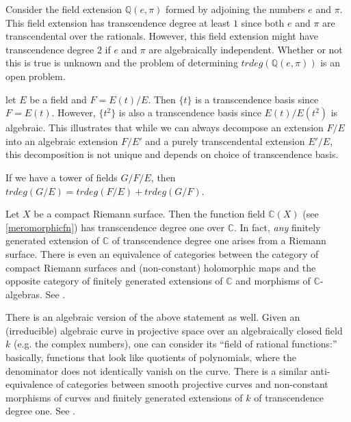 \begin{example} Consider the field extension $\mathbb{Q}(e,\pi)$ formed by
adjoining the numbers $e$ and $\pi$. This field extension has transcendence
degree at least $1$ since both $e$ and $\pi$ are transcendental over the
rationals. However, this field extension might have transcendence degree $2$ if
$e$ and $\pi$ are algebraically independent. Whether or not this is true is
unknown and the problem of determining $trdeg(\mathbb{Q}(e,\pi))$ is an open
problem.\end{example}

\begin{example} let $E$ be a field and $F=E(t)/E$. Then $\{t\}$ is a
transcendence basis since $F=E(t)$. However, $\{t^2\}$ is also a transcendence
basis since $E(t)/E(t^2)$ is algebraic. This illustrates that while we can
always decompose an extension $F/E$ into an algebraic extension $F/E'$ and a
purely transcendental extension $E'/E$, this decomposition is not unique and
depends on choice of transcendence basis. \end{example}

\begin{exercise} If we have a tower of fields $G/F/E$, then $trdeg(G/E)=trdeg(F/E)+trdeg(G/F)$. \end{exercise}

\begin{example} 
Let $X$ be a compact Riemann surface. Then the function field $\mathbb{C}(X)$
(see \cref{meromorphicfn}) has transcendence degree one over $\mathbb{C}$. In
fact, \emph{any} finitely generated extension of $\mathbb{C}$ of transcendence
degree one arises from a Riemann surface. There is even an equivalence of
categories between the category of compact Riemann surfaces and
(non-constant) holomorphic maps 
and the opposite category of finitely generated extensions of $\mathbb{C}$ and
morphisms of $\mathbb{C}$-algebras. See \cite{Fo81}.

There is an algebraic version of the above statement as well. Given an
(irreducible) algebraic curve in projective space over an algebraically
closed field $k$ (e.g. the complex numbers), one can consider its ``field of rational
functions:'' basically, functions that look like quotients of polynomials,
where the denominator does not identically vanish on the curve. 
There is a similar anti-equivalence of categories between smooth projective curves and
non-constant morphisms of curves and finitely generated extensions of $k$ of
transcendence degree one. See \cite{Ha77}.
\end{example} 


